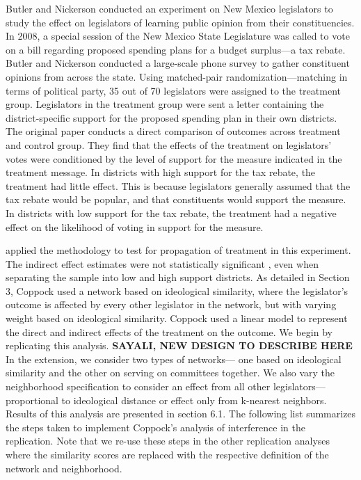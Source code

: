 \documentclass[12pt]{article}
\begin{document}
Butler and Nickerson conducted an experiment on New Mexico legislators to study the effect on legislators of learning public opinion from their constituencies. In 2008, a special session of the New Mexico State Legislature was called to vote on a bill regarding proposed spending plans for a budget surplus---a tax rebate. Butler and Nickerson conducted a large-scale phone survey to gather constituent opinions from across the state. Using matched-pair randomization---matching in terms of political party, 35 out of 70 legislators were assigned to the treatment group. Legislators in the treatment group were sent a letter containing the district-specific support for the proposed spending plan in their own districts. The original paper conducts a direct comparison of outcomes across treatment and control group.  They find that the effects of the treatment on legislators' votes were conditioned by the level of support for the measure indicated in the treatment message. In districts with high support for the tax rebate, the treatment had little effect. This is because legislators generally assumed that the tax rebate would be popular, and that constituents would support the measure. In districts with low support for the tax rebate, the treatment had a negative effect on the likelihood of voting in support for the measure. 

\citet{coppock2014information} applied the \citet{bowers2012reasoning} methodology to test for propagation of treatment in this experiment. The indirect effect estimates were not statistically significant \citep{coppock2016information}, even when separating the sample into low and high support districts. As detailed in Section 3, Coppock used a network based on ideological similarity, where the legislator's outcome is affected by every other legislator in the network, but with varying weight based on ideological similarity. Coppock used a linear model to represent the direct and indirect effects of the treatment on the outcome. We begin by replicating this analysis. {\bf SAYALI, NEW DESIGN TO DESCRIBE HERE} In the extension, we consider two types of networks--- one based on ideological similarity and the other on serving on committees together. We also vary the neighborhood specification to consider an effect from all other legislators---proportional to ideological distance or effect only from k-nearest neighbors. Results of this analysis are presented in section 6.1. The following list summarizes the steps taken to implement Coppock's analysis of interference in the \citet{butler2011can} replication. Note that we re-use these steps in the other replication analyses where the similarity scores are replaced with the respective definition of the network and neighborhood.
\end{document}
